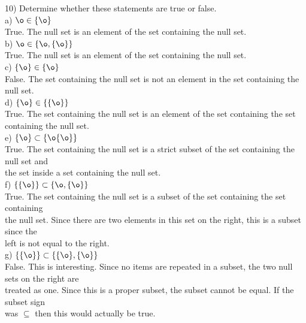 \documentclass{article}
\begin{document}
\begin{flushleft}
\setlength\parindent{0pt}10) Determine whether these statements are true or false. \\
\setlength\parindent{24pt}a) $\o \in \{ \o \}$ \\
\setlength\parindent{48pt} True.  The null set is an element of the set containing the null set. \\
\setlength\parindent{24pt}b) $\o \in \{ \o, \{ \o \}\} $\\
\setlength\parindent{48pt} True.  The null set is an element of the set containing the null set. \\
\setlength\parindent{24pt}c) $ \{ \o \} \in \{ \o \} $ \\ 
\setlength\parindent{48pt} False.  The set containing the null set is not an element in the set containing the null set. \\
\setlength\parindent{24pt}d) $\{ \o \} \in \{\{\o\}\}$ \\
\setlength\parindent{48pt} True.  The set containing the null set is an element of the set containing the set \\containing the null set. \\
\setlength\parindent{24pt}e) $\{ \o \} \subset \{ \o \{ \o \} \}$ \\
\setlength\parindent{48pt} True.  The set containing the null set is a strict subset of the set containing the null set and \\the set inside a set containing the null set. \\
\setlength\parindent{24pt}f) $\{\{\o\}\} \subset \{\o, \{\o\}\}$ \\
\setlength\parindent{48pt} True.  The set containing the null set is a subset of the set containing the set containing \\the null set.  Since there are two elements in this set on the right, this is a subset since the \\left is not equal to the right.\\
\setlength\parindent{24pt}g) $\{\{\o\}\} \subset \{\{\o\}, \{\o\}\}$ \\
\setlength\parindent{48pt} False.  This is interesting.  Since no items are repeated in a subset, the two null sets on the right are\\ treated as one.  Since this is a proper subset, the subset cannot be equal.  If the subset sign \\was $\subseteq$ then this would actually be true. \\



\end{flushleft}
\end{document}
